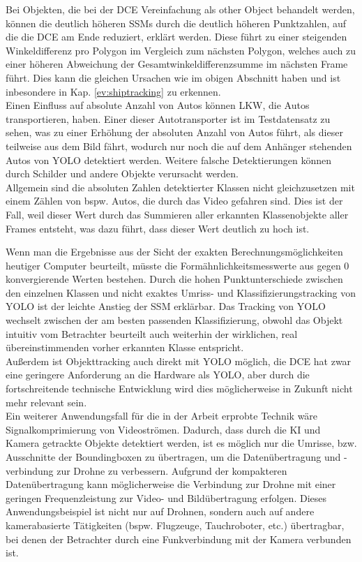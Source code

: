 {{	Bei Objekten, die bei der DCE Vereinfachung als \glqq other Object\grqq{} behandelt werden, können die deutlich höheren SSMs durch die deutlich höheren Punktzahlen, auf die die DCE am Ende reduziert, erklärt werden. Diese führt zu einer steigenden Winkeldifferenz pro Polygon im Vergleich zum nächsten Polygon, welches auch zu einer höheren Abweichung der Gesamtwinkeldifferenzsumme im nächsten Frame führt. Dies kann die gleichen Ursachen wie im obigen Abschnitt haben und ist inbesondere in Kap. \ref{ev:shiptracking} zu erkennen. \\

	Einen Einfluss auf absolute Anzahl von Autos können LKW, die Autos transportieren, haben. Einer dieser Autotransporter ist im Testdatensatz zu sehen, was zu einer Erhöhung der absoluten Anzahl von Autos führt, als dieser teilweise aus dem Bild fährt, wodurch nur noch die auf dem Anhänger stehenden Autos von YOLO detektiert werden. Weitere falsche Detektierungen können durch Schilder und andere Objekte verursacht werden. \\
	Allgemein sind die absoluten Zahlen detektierter Klassen nicht gleichzusetzen mit einem Zählen von bspw. Autos, die durch das Video gefahren sind. Dies ist der Fall, weil dieser Wert durch das Summieren aller erkannten Klassenobjekte aller Frames entsteht, was dazu führt, dass dieser Wert deutlich zu hoch ist.

	Wenn man die Ergebnisse aus der Sicht der exakten Berechnungsmöglichkeiten heutiger Computer beurteilt, müsste die Formähnlichkeitsmesswerte aus gegen 0 konvergierende Werten bestehen. Durch die hohen Punktunterschiede zwischen den einzelnen Klassen und nicht exaktes Umriss- und Klassifizierungstracking von YOLO ist der leichte Anstieg der SSM erklärbar. Das Tracking von YOLO wechselt zwischen der am besten passenden Klassifizierung, obwohl das Objekt intuitiv vom Betrachter beurteilt auch weiterhin der wirklichen, real übereinstimmenden vorher erkannten Klasse entspricht. \\
	Außerdem ist Objekttracking auch direkt mit YOLO möglich, die DCE hat zwar eine geringere Anforderung an die Hardware als YOLO, aber durch die fortschreitende technische Entwicklung wird dies möglicherweise in Zukunft nicht mehr relevant sein. \\

	Ein weiterer Anwendungsfall für die in der Arbeit erprobte Technik wäre Signalkomprimierung von Videoströmen. Dadurch, dass durch die KI und Kamera getrackte Objekte detektiert werden, ist es möglich nur die Umrisse, bzw. Ausschnitte der Boundingboxen zu übertragen, um die Datenübertragung und -verbindung zur Drohne zu verbessern. Aufgrund der kompakteren Datenübertragung kann möglicherweise die Verbindung zur Drohne mit einer geringen Frequenzleistung zur Video- und Bildübertragung erfolgen. Dieses Anwendungsbeispiel ist nicht nur auf Drohnen, sondern auch auf andere kamerabasierte Tätigkeiten (bspw. Flugzeuge, Tauchroboter, etc.) übertragbar, bei denen der Betrachter durch eine Funkverbindung mit der Kamera verbunden ist.

}}
